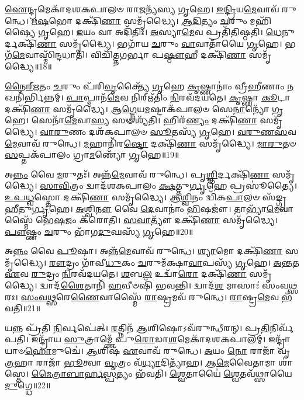 \-\ul{𑌐}\-𑌨𑍍𑌦𑍍𑌰𑌮𑍇𑌕𑌾᳴\-𑌦𑌶\-𑌕𑌪𑌾𑌲𑍞 𑌰𑌾\-\ul{𑌜}\-𑌨𑍍𑌯᳴𑌸𑍍𑌯 \ul{𑌗𑍃}\-𑌹𑍇।
\-\ul{𑌇}\-\-\ul{𑌨𑍍𑌦𑍍𑌰𑌿}\-𑌯\-\ul{𑌮𑍇}\-𑌵𑌾𑌵᳴ 𑌰𑍁𑌨𑍍𑌧𑍇।
\-\ul{𑌋}\-\-\ul{𑌷}\-𑌭𑍋 𑌦𑌕𑍍𑌷𑌿᳴\-\ul{𑌣𑌾} 𑌸𑌮𑍃᳴𑌦𑍍𑌧𑍍𑌯𑍈।
\-\ul{𑌆}\-\-\ul{𑌦𑌿}\-𑌤𑍍𑌯𑌂 \ul{𑌚}\-𑌰𑍁𑌂 𑌮𑌹𑌿᳴𑌷𑍍𑌯𑍈 \ul{𑌗𑍃}\-𑌹𑍇।
\-\ul{𑌇}\-𑌯𑌂 𑌵𑌾 𑌅𑌦𑌿᳴𑌤𑌿𑌃।
\-\ul{𑌅}\-𑌸𑍍𑌯𑌾\-\ul{𑌮𑍇}\-𑌵 𑌪𑍍𑌰𑌤𑌿᳴𑌤𑌿𑌷𑍍𑌠𑌤𑌿।
\-\ul{𑌧𑍇}\-𑌨𑍁𑌰𑍍𑌦𑌕𑍍𑌷𑌿᳴\-\ul{𑌣𑌾} 𑌸𑌮𑍃᳴𑌦𑍍𑌧𑍍𑌯𑍈।
𑌭𑌗𑌾᳴𑌯 \ul{𑌚}\-𑌰𑍁𑌂 \ul{𑌵𑌾}\-𑌵𑌾𑌤𑌾᳴𑌯𑍈 \ul{𑌗𑍃}\-𑌹𑍇।
𑌭𑌗᳴\-\ul{𑌮𑍇}\-𑌵𑌾𑌸𑍍𑌮𑌿᳴𑌨𑍍𑌦𑌧𑌾𑌤𑌿।
𑌵𑌿𑌚𑌿᳴𑌤𑍍𑌤𑌗𑌰𑍍𑌭𑌾 𑌪\-\ul{𑌷𑍍𑌠𑍗}\-𑌹𑍀 𑌦𑌕𑍍𑌷𑌿᳴\-\ul{𑌣𑌾} 𑌸𑌮𑍃᳴𑌦𑍍𑌧𑍍𑌯𑍈॥18॥

\-\ul{𑌨𑍈}\-\-\ul{𑌰𑍍}\-\-\ul{𑌋}\-𑌤𑌂 \ul{𑌚}\-𑌰𑍁𑌂 𑌪᳴𑌰𑌿\-\ul{𑌵𑍃}\-𑌕𑍍𑌤𑍍𑌯𑍈᳴ \ul{𑌗𑍃}\-𑌹𑍇 \ul{𑌕𑍃}\-𑌷𑍍𑌣𑌾𑌨𑌾𑌂॑ 𑌵𑍍𑌰𑍀\-\ul{𑌹𑍀}\-𑌣𑌾𑌂 \ul{𑌨}\-𑌖𑌨𑌿᳴𑌰𑍍𑌭𑌿𑌨𑍍𑌨𑌮𑍍।
\-\ul{𑌪𑌾}\-𑌪𑍍𑌮𑌾𑌨᳴\-\ul{𑌮𑍇}\-𑌵 𑌨𑌿𑌰𑍍\mbox{}𑌋᳴𑌤𑌿𑌂 \ul{𑌨𑌿}\-𑌰𑌵᳴𑌦𑌯𑌤𑍇।
\-\ul{𑌕𑍃}\-𑌷𑍍𑌣𑌾 \ul{𑌕𑍂}\-𑌟𑌾 𑌦𑌕𑍍𑌷𑌿᳴\-\ul{𑌣𑌾} 𑌸𑌮𑍃᳴𑌦𑍍𑌧𑍍𑌯𑍈।
\-\ul{𑌆}\-\-\ul{𑌗𑍍𑌨𑍇}\-𑌯\-\ul{𑌮}\-𑌷𑍍𑌟𑌾\-𑌕᳴𑌪𑌾𑌲𑍞 𑌸𑍇\-\ul{𑌨𑌾}\-𑌨𑍍𑌯𑍋᳴ \ul{𑌗𑍃}\-𑌹𑍇।
𑌸𑍇𑌨𑌾᳴\-\ul{𑌮𑍇}\-𑌵𑌾\-\ul{𑌸𑍍𑌯} 𑌸𑍟𑌶𑍍𑌯᳴𑌤𑌿।
𑌹𑌿𑌰᳴\-\ul{𑌣𑍍𑌯𑌂} 𑌦𑌕𑍍𑌷𑌿᳴\-\ul{𑌣𑌾} 𑌸𑌮𑍃᳴𑌦𑍍𑌧𑍍𑌯𑍈।
\-\ul{𑌵𑌾}\-\-\ul{𑌰𑍁}\-𑌣𑌂 𑌦𑌶᳴𑌕𑌪𑌾𑌲𑍞 \ul{𑌸𑍂}\-𑌤𑌸𑍍𑌯᳴ \ul{𑌗𑍃}\-𑌹𑍇।
\-\ul{𑌵}\-\-\ul{𑌰𑍁}\-\-\ul{𑌣}\-\-\ul{𑌸}\-𑌵\-\ul{𑌮𑍇}\-𑌵𑌾𑌵᳴ 𑌰𑍁𑌨𑍍𑌧𑍇।
\-\ul{𑌮}\-𑌹𑌾𑌨𑌿᳴𑌰\-\ul{𑌷𑍍𑌟𑍋} 𑌦𑌕𑍍𑌷𑌿᳴\-\ul{𑌣𑌾} 𑌸𑌮𑍃᳴𑌦𑍍𑌧𑍍𑌯𑍈।
\-\ul{𑌮𑌾}\-\-\ul{𑌰𑍁}\-𑌤𑍞 \ul{𑌸}\-𑌪𑍍𑌤𑌕᳴𑌪𑌾𑌲𑌂 𑌗𑍍𑌰𑌾\-\ul{𑌮}\-𑌣𑍍𑌯𑍋᳴ \ul{𑌗𑍃}\-𑌹𑍇॥19॥

𑌅\-\ul{𑌨𑍍𑌨𑌂} 𑌵𑍈 \ul{𑌮}\-𑌰𑍁𑌤𑌃᳴।
𑌅𑌨𑍍𑌨᳴\-\ul{𑌮𑍇}\-𑌵𑌾𑌵᳴ 𑌰𑍁𑌨𑍍𑌧𑍇।
𑌪𑍃\-\ul{𑌶𑍍𑌞𑌿}\-𑌰𑍍𑌦𑌕𑍍𑌷𑌿᳴\-\ul{𑌣𑌾} 𑌸𑌮𑍃᳴𑌦𑍍𑌧𑍍𑌯𑍈।
\-\ul{𑌸𑌾}\-\-\ul{𑌵𑌿}\-𑌤𑍍𑌰𑌂 𑌦𑍍𑌵𑌾𑌦᳴𑌶𑌕𑌪𑌾𑌲𑌂 \ul{𑌕𑍍𑌷}\-𑌤𑍍𑌤𑍁\-\ul{𑌰𑍍𑌗𑍃}\-𑌹𑍇 𑌪𑍍𑌰𑌸𑍂॑𑌤𑍍𑌯𑍈।
\-\ul{𑌉}\-\-\ul{𑌪}\-\-\ul{𑌧𑍍𑌵}\-𑌸𑍍𑌤𑍋 𑌦𑌕𑍍𑌷𑌿᳴\-\ul{𑌣𑌾} 𑌸𑌮𑍃᳴𑌦𑍍𑌧𑍍𑌯𑍈।
\-\ul{𑌆}\-\-\ul{𑌶𑍍𑌵𑌿}\-𑌨𑌂 𑌦𑍍𑌵𑌿᳴𑌕\-\ul{𑌪𑌾}\-𑌲𑍞 𑌸᳴𑌙𑍍𑌗𑍍𑌰\-\ul{𑌹𑍀}\-𑌤𑍁\-\ul{𑌰𑍍𑌗𑍃}\-𑌹𑍇।
\-\ul{𑌅}\-𑌶𑍍𑌵𑌿\-\ul{𑌨𑍗} 𑌵𑍈 \ul{𑌦𑍇}\-𑌵𑌾𑌨𑌾𑌂॑ \ul{𑌭𑌿}\-𑌷𑌜𑍗॑।
𑌤𑌾𑌭𑍍𑌯𑌾᳴\-\ul{𑌮𑍇}\-𑌵𑌾𑌸𑍍𑌮𑍈᳴ 𑌭𑍇\-\ul{𑌷}\-𑌜𑌂 𑌕᳴𑌰𑍋𑌤𑌿।
\-\ul{𑌸}\-\-\ul{𑌵𑌾}\-𑌤𑍍𑌯𑍗᳴ 𑌦𑌕𑍍𑌷𑌿᳴\-\ul{𑌣𑌾} 𑌸𑌮𑍃᳴𑌦𑍍𑌧𑍍𑌯𑍈।
\-\ul{𑌪𑍗}\-𑌷𑍍𑌣𑌂 \ul{𑌚}\-𑌰𑍁𑌂 𑌭𑌾᳴𑌗\-\ul{𑌦𑍁}\-𑌘𑌸𑍍𑌯᳴ \ul{𑌗𑍃}\-𑌹𑍇॥20॥

𑌅\-\ul{𑌨𑍍𑌨𑌂} 𑌵𑍈 \ul{𑌪𑍂}\-𑌷𑌾।
𑌅𑌨𑍍𑌨᳴\-\ul{𑌮𑍇}\-𑌵𑌾𑌵᳴ 𑌰𑍁𑌨𑍍𑌧𑍇।
\-\ul{𑌶𑍍𑌯𑌾}\-𑌮𑍋 𑌦𑌕𑍍𑌷𑌿᳴\-\ul{𑌣𑌾} 𑌸𑌮𑍃᳴𑌦𑍍𑌧𑍍𑌯𑍈।
\-\ul{𑌰𑍗}\-𑌦𑍍𑌰𑌂 𑌗𑌾᳴𑌵𑍀\-\ul{𑌧𑍁}\-𑌕𑌂 \ul{𑌚}\-𑌰𑍁𑌮᳴𑌕𑍍𑌷𑌾\-\ul{𑌵𑌾}\-𑌪𑌸𑍍𑌯᳴ \ul{𑌗𑍃}\-𑌹𑍇।
\-\ul{𑌅}\-\-\ul{𑌨𑍍𑌤}\-𑌤 \ul{𑌏}\-𑌵 \ul{𑌰𑍁}\-𑌦𑍍𑌰𑌂 \ul{𑌨𑌿}\-𑌰𑌵᳴𑌦𑌯𑌤𑍇।
\-\ul{𑌶}\-𑌬\-\ul{𑌲} 𑌉𑌦𑍍𑌵𑌾᳴\-\ul{𑌰𑍋} 𑌦𑌕𑍍𑌷𑌿᳴\-\ul{𑌣𑌾} 𑌸𑌮𑍃᳴𑌦𑍍𑌧𑍍𑌯𑍈।
𑌦𑍍𑌵𑌾𑌦᳴\-\ul{𑌶𑍈}\-𑌤𑌾𑌨𑌿᳴ \ul{𑌹}\-𑌵𑍀𑍞𑌷𑌿᳴ 𑌭𑌵𑌨𑍍𑌤𑌿।
𑌦𑍍𑌵𑌾𑌦᳴\-\ul{𑌶} 𑌮𑌾𑌸𑌾𑌃॑ 𑌸𑌂𑌵\-\ul{𑌥𑍍𑌸}\-𑌰𑌃।
\-\ul{𑌸𑌂}\-\-\ul{𑌵}\-\-\ul{𑌥𑍍𑌸}\-𑌰𑍇\-\ul{𑌣𑍈}\-𑌵𑌾𑌸𑍍𑌮𑍈᳴ \ul{𑌰𑌾}\-𑌷𑍍𑌟𑍍𑌰𑌮𑌵᳴ 𑌰𑍁𑌨𑍍𑌧𑍇।
\-\ul{𑌰𑌾}\-𑌷𑍍𑌟𑍍𑌰\-\ul{𑌮𑍇}\-𑌵 𑌭᳴𑌵𑌤𑌿॥21॥

𑌯𑌨𑍍𑌨 𑌪𑍍𑌰᳴𑌤𑌿 \ul{𑌨𑌿}\-𑌰𑍍𑌵𑌪𑍇॑𑌤𑍍।
\-\ul{𑌰}\-𑌤𑍍𑌨𑌿𑌨᳴ \ul{𑌆}\-𑌶𑌿𑌷𑍋\-𑌽𑌵᳴𑌰𑍁𑌨𑍍𑌧𑍀𑌰𑌨𑍍।
𑌪𑍍𑌰\-\ul{𑌤𑌿}\-𑌨𑌿𑌰𑍍𑌵᳴𑌪𑌤𑌿।
𑌇𑌨𑍍𑌦𑍍𑌰𑌾᳴𑌯 \ul{𑌸𑍁}\-𑌤𑍍𑌰𑌾𑌮𑍍𑌣𑍇᳴ 𑌪𑍁\-\ul{𑌰𑍋}\-𑌡𑌾\-\ul{𑌶}\-𑌮𑍇𑌕𑌾᳴\-𑌦𑌶\-𑌕𑌪𑌾𑌲𑌮𑍍।
𑌇𑌨𑍍𑌦𑍍𑌰𑌾᳴𑌯𑌾𑍞\-\ul{𑌹𑍋}\-𑌮𑍁𑌚𑍇॑।
\-\ul{𑌆}\-𑌶𑌿𑌷᳴ \ul{𑌏}\-𑌵𑌾𑌵᳴ 𑌰𑍁𑌨𑍍𑌧𑍇।
\-\ul{𑌅}\-𑌯𑌂 \ul{𑌨𑍋} 𑌰𑌾𑌜𑌾᳴ 𑌵𑍃\-\ul{𑌤𑍍𑌰}\-𑌹𑌾 𑌰𑌾𑌜𑌾᳴ \ul{𑌭𑍂}\-𑌤𑍍𑌵𑌾 \ul{𑌵𑍃}\-𑌤𑍍𑌰𑌂 𑌵᳴\-\ul{𑌧𑍍𑌯𑌾}\-𑌦𑌿𑌤𑍍𑌯𑌾᳴𑌹।
\-\ul{𑌆}\-\-\-\ul{𑌮𑍇}\-𑌵𑍈𑌤𑌾𑌮𑌾 𑌶𑌾॑𑌸𑍍𑌤𑍇।
\-\ul{𑌮𑍈}\-\-\ul{𑌤𑍍𑌰𑌾}\-\-\ul{𑌬𑌾}\-\-\ul{𑌰𑍍}\-\-\ul{𑌹}\-\-\ul{𑌸𑍍𑌪}\-𑌤𑍍𑌯𑌂 𑌭᳴𑌵𑌤𑌿।
\-\ul{𑌶𑍍𑌵𑍇}\-𑌤𑌾𑌯𑍈॑ \ul{𑌶𑍍𑌵𑍇}\-𑌤𑌵᳴𑌥𑍍𑌸𑌾𑌯𑍈 \ul{𑌦𑍁}\-𑌗𑍍𑌧𑍇॥22॥

